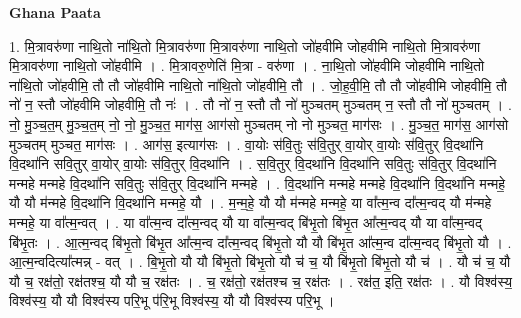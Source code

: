 \documentclass[17pt]{extarticle}
\begin{document}
\textbf{Ghana Paata } \newline

1. मि॒त्रावरु॑णा नाथि॒तो ना॑थि॒तो मि॒त्रावरु॑णा मि॒त्रावरु॑णा नाथि॒तो जो॑हवीमि जोहवीमि नाथि॒तो मि॒त्रावरु॑णा मि॒त्रावरु॑णा नाथि॒तो जो॑हवीमि । . मि॒त्रावरु॒णेति॑ मि॒त्रा - वरु॑णा । . ना॒थि॒तो जो॑हवीमि जोहवीमि नाथि॒तो ना॑थि॒तो जो॑हवीमि॒ तौ तौ जो॑हवीमि नाथि॒तो ना॑थि॒तो जो॑हवीमि॒ तौ । . जो॒ह॒वी॒मि॒ तौ तौ जो॑हवीमि जोहवीमि॒ तौ नो॑ न॒ स्तौ जो॑हवीमि जोहवीमि॒ तौ नः॑ । . तौ नो॑ न॒ स्तौ तौ नो॑ मुञ्चतम् मुञ्चतम् न॒ स्तौ तौ नो॑ मुञ्चतम् । . नो॒ मु॒ञ्च॒त॒म् मु॒ञ्च॒त॒म् नो॒ नो॒ मु॒ञ्च॒त॒ माग॑स॒ आग॑सो मुञ्चतम् नो नो मुञ्चत॒ माग॑सः । . मु॒ञ्च॒त॒ माग॑स॒ आग॑सो मुञ्चतम् मुञ्चत॒ माग॑सः । . आग॑स॒ इत्याग॑सः । . वा॒योः स॑वि॒तुः स॑वि॒तुर् वा॒योर् वा॒योः स॑वि॒तुर् वि॒दथा॑नि वि॒दथा॑नि सवि॒तुर् वा॒योर् वा॒योः स॑वि॒तुर् वि॒दथा॑नि । . स॒वि॒तुर् वि॒दथा॑नि वि॒दथा॑नि सवि॒तुः स॑वि॒तुर् वि॒दथा॑नि मन्महे मन्महे वि॒दथा॑नि सवि॒तुः स॑वि॒तुर् वि॒दथा॑नि मन्महे । . वि॒दथा॑नि मन्महे मन्महे वि॒दथा॑नि वि॒दथा॑नि मन्महे॒ यौ यौ म॑न्महे वि॒दथा॑नि वि॒दथा॑नि मन्महे॒ यौ । . म॒न्म॒हे॒ यौ यौ म॑न्महे मन्महे॒ या वा᳚त्म॒न्व दा᳚त्म॒न्वद् यौ म॑न्महे मन्महे॒ या वा᳚त्म॒न्वत् । . या वा᳚त्म॒न्व दा᳚त्म॒न्वद् यौ या वा᳚त्म॒न्वद् बि॑भृ॒तो बि॑भृ॒त आ᳚त्म॒न्वद् यौ या वा᳚त्म॒न्वद् बि॑भृ॒तः । . आ॒त्म॒न्वद् बि॑भृ॒तो बि॑भृ॒त आ᳚त्म॒न्व दा᳚त्म॒न्वद् बि॑भृ॒तो यौ यौ बि॑भृ॒त आ᳚त्म॒न्व दा᳚त्म॒न्वद् बि॑भृ॒तो यौ । . आ॒त्म॒न्वदित्या᳚त्मन्न् - वत् । . बि॒भृ॒तो यौ यौ बि॑भृ॒तो बि॑भृ॒तो यौ च॑ च॒ यौ बि॑भृ॒तो बि॑भृ॒तो यौ च॑ । . यौ च॑ च॒ यौ यौ च॒ रक्ष॑तो॒ रक्ष॑तश्च॒ यौ यौ च॒ रक्ष॑तः । . च॒ रक्ष॑तो॒ रक्ष॑तश्च च॒ रक्ष॑तः । . रक्ष॑त॒ इति॒ रक्ष॑तः । . यौ विश्व॑स्य॒ विश्व॑स्य॒ यौ यौ विश्व॑स्य परि॒भू प॑रि॒भू विश्व॑स्य॒ यौ यौ विश्व॑स्य परि॒भू । \newline
\end{document}
